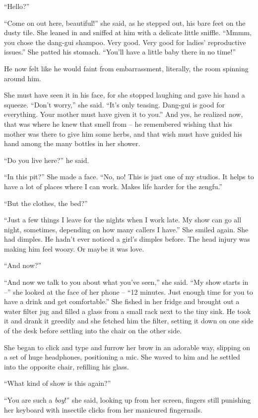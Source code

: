 ``Hello?''

``Come on out here, beautiful!'' she said, as he stepped out, his
bare feet on the dusty tile. She leaned in and sniffed at him with
a delicate little sniffle. ``Mmmm, you chose the dang-gui shampoo.
Very good. Very good for ladies' reproductive issues.'' She patted
his stomach. ``You'll have a little baby there in no time!''

He now felt like he would faint from embarrassment, literally, the
room spinning around him.

She must have seen it in his face, for she stopped laughing and
gave his hand a squeeze. ``Don't worry,'' she said. ``It's only
teasing. Dang-gui is good for everything. Your mother must have
given it to you.'' And yes, he realized now, that was where he knew
that smell from -- he remembered wishing that his mother was there
to give him some herbs, and that wish must have guided his hand
among the many bottles in her shower.

``Do you live here?'' he said.

``In this pit?'' She made a face. ``No, no! This is just one of my
studios. It helps to have a lot of places where I can work. Makes
life harder for the zengfu.''

``But the clothes, the bed?''

``Just a few things I leave for the nights when I work late. My show
can go all night, sometimes, depending on how many callers I have.''
She smiled again. She had dimples. He hadn't ever noticed a girl's
dimples before. The head injury was making him feel woozy. Or maybe
it was love.

``And now?''

``And now we talk to you about what you've seen,'' she said. ``My show
starts in --'' she looked at the face of her phone -- ``12 minutes.
Just enough time for you to have a drink and get comfortable.'' She
fished in her fridge and brought out a water filter jug and filled
a glass from a small rack next to the tiny sink. He took it and
drank it greedily and she fetched him the filter, setting it down
on one side of the desk before settling into the chair on the other
side.

She began to click and type and furrow her brow in an adorable way,
slipping on a set of huge headphones, positioning a mic. She waved
to him and he settled into the opposite chair, refilling his
glass.

``What kind of show is this again?''

``You are such a \emph{boy}!'' she said, looking up from her screen,
fingers still punishing her keyboard with insectile clicks from her
manicured fingernails.


